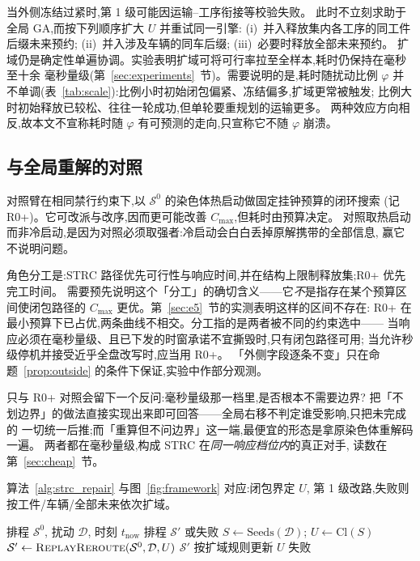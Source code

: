 \documentclass[manuscript,screen,review]{acmart}
\providecommand{\STRC}{\textsc{STRC}}
\begin{document}
当外侧冻结过紧时,第 1 级可能因运输--工序衔接等校验失败。
此时不立刻求助于全局 GA,而按下列顺序扩大 \(U\) 并重试同一引擎:
(i)~并入释放集内各工序的同工件后缀未来预约;
(ii)~并入涉及车辆的同车后缀;
(iii)~必要时释放全部未来预约。
扩域仍是确定性单遍协调。实验表明扩域可将可行率拉至全样本,耗时仍保持在毫秒至十余
毫秒量级(第~\ref{sec:experiments}~节)。需要说明的是,耗时随扰动比例 \(\varphi\)
并不单调(表~\ref{tab:scale}):比例小时初始闭包偏紧、冻结偏多,扩域更常被触发;
比例大时初始释放已较松、往往一轮成功,但单轮要重规划的运输更多。
两种效应方向相反,故本文不宣称耗时随 \(\varphi\) 有可预测的走向,只宣称它不随
\(\varphi\) 崩溃。

\subsection{与全局重解的对照}
\label{sec:vs_r0}

对照臂在相同禁行约束下,以 \(\mathcal{S}^0\) 的染色体热启动做固定挂钟预算的闭环搜索
(记 R0+)。它可改派与改序,因而更可能改善 \(C_{\max}\),但耗时由预算决定。
对照取热启动而非冷启动,是因为对照必须取强者:冷启动会白白丢掉原解携带的全部信息,
赢它不说明问题。

角色分工是:\STRC{} 路径优先可行性与响应时间,并在结构上限制释放集;R0+ 优先完工时间。
需要预先说明这个「分工」的确切含义——它\emph{不}是指存在某个预算区间使闭包路径的
\(C_{\max}\) 更优。第~\ref{sec:e5}~节的实测表明这样的区间不存在:
R0+ 在最小预算下已占优,两条曲线不相交。分工指的是两者被不同的约束选中——
当响应必须在毫秒量级、且已下发的时窗承诺不宜撕毁时,只有闭包路径可用;
当允许秒级停机并接受近乎全盘改写时,应当用 R0+。
「外侧字段逐条不变」只在命题~\ref{prop:outside} 的条件下保证,实验中作部分观测。

只与 R0+ 对照会留下一个反问:毫秒量级那一档里,是否根本不需要边界?
把「不划边界」的做法直接实现出来即可回答——全局右移不判定谁受影响,只把未完成的
一切统一后推;而「重算但不问边界」这一端,最便宜的形态是拿原染色体重解码一遍。
两者都在毫秒量级,构成 \STRC{} 在\emph{同一响应档位内}的真正对手,
读数在第~\ref{sec:cheap}~节。

算法~\ref{alg:strc_repair} 与图~\ref{fig:framework} 对应:闭包界定 \(U\),
第 1 级改路,失败则按工件/车辆/全部未来依次扩域。

\begin{algorithm}[t]
\caption{基于 \STRC{} 的有界恢复(第 1 级 + 扩域)}
\label{alg:strc_repair}
\begin{algorithmic}[1]
\Require 排程 \(\mathcal{S}^0\), 扰动 \(\mathcal{D}\), 时刻 \(t_{\mathrm{now}}\)
\Ensure 排程 \(\mathcal{S}'\) 或失败
\State \(S \gets \mathrm{Seeds}(\mathcal{D})\);
      \(U \gets \mathrm{Cl}(S)\)
  \State \(\mathcal{S}' \gets \textsc{ReplayReroute}(\mathcal{S}^0,\mathcal{D},U)\)
    \State \Return \(\mathcal{S}'\)
  \EndIf
  \State 按扩域规则更新 \(U\) 
\EndFor
\State \Return 失败
\end{algorithmic}
\end{algorithm}
\end{document}

